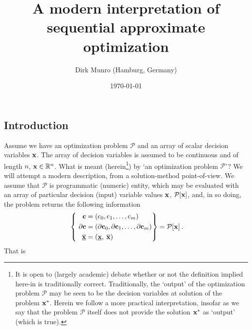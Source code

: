 \documentclass[11pt]{article}
\title{A modern interpretation of sequential approximate optimization}
\author{Dirk Munro (Hamburg, Germany)}
\date{\today }
\begin{document}
\maketitle

\subsection{Introduction}

Assume we have an optimization problem $\mathcal{P}$ and an array of scalar decision variables $\mathbf{x}$. The array of decision variables is assumed to be continuous and of length $n$, $\mathbf{x} \in \mathbb{R}^n$. What is meant (herein\footnote{It is open to (largely academic) debate whether or not the definition implied here-in is traditionally correct. Traditionally, the `output' of the optimization problem $\mathcal{P}$ may be seen to be the decision variables at solution of the problem $\mathbf{x}^\ast$. Herein we follow a more practical interpretation, insofar as we say that the problem $\mathcal{P}$ itself does not provide the solution $\mathbf{x}^\ast$ as `output' (which is true).}) by `an optimization problem $\mathcal{P}$'? We will attempt a modern description, from a solution-method point-of-view. We assume that $\mathcal{P}$ is programmatic (numeric) entity, which may be evaluated with an array of particular decision (input) variable values $\mathbf{x}$, $\mathcal{P}[\mathbf{x}]$, and, in so doing, the problem returns the following information
\begin{align}
\label{d:eqn:p}
 ~\left\{ ~
\begin{aligned}
\mathbf{c} &= (\textrm{c}_0, \textrm{c}_1, \ldots, \textrm{c}_m ) \\
\mathbf{\partial c} & = (\mathbf{\partial c}_0 , \mathbf{\partial c}_1 , \ldots,\mathbf{\partial c}_m  ) \\ \underline{\overline{\mathbf{x}}} & = ( \underline{\mathbf{x}} , \: \overline{\mathbf{x}} ) \:
\end{aligned}\right\} =
\mathcal{P} [\mathbf{x}] \: .
\end{align}
That is 
\end{document}
